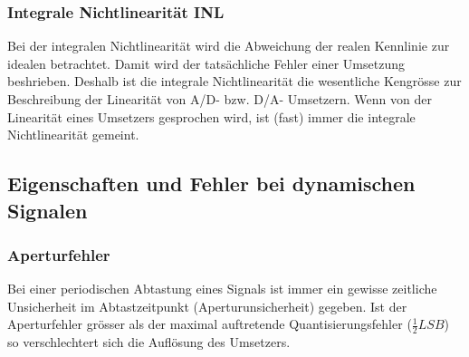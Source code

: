 \subsubsection{Integrale Nichtlinearität INL }
Bei der integralen Nichtlinearität wird die Abweichung der realen
Kennlinie zur idealen betrachtet. Damit wird der tatsächliche Fehler einer
Umsetzung beshrieben. Deshalb ist die integrale Nichtlinearität die wesentliche
Kengrösse zur Beschreibung der Linearität von A/D- bzw. D/A- Umsetzern. Wenn
von der Linearität eines Umsetzers gesprochen wird, ist (fast) immer die
integrale Nichtlinearität gemeint.
\begin{figure}[!ht]
\begin{center}
\end{center}
\end{figure}


\subsection{Eigenschaften und Fehler bei dynamischen Signalen}
\subsubsection{Aperturfehler} 
Bei einer periodischen Abtastung eines Signals ist immer ein gewisse zeitliche
Unsicherheit im Abtastzeitpunkt (Aperturunsicherheit) gegeben. Ist der Aperturfehler grösser als der maximal
auftretende Quantisierungsfehler ($\frac{1}{2}LSB$) so verschlechtert sich die Auflösung des Umsetzers. 


